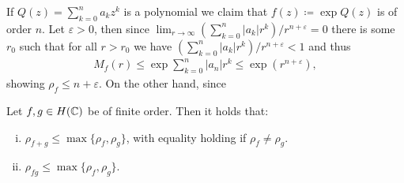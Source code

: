 \begin{remark}\label{rem:order-exponential-polynomial}
    If $Q(z) = \sum_{k=0}^n a_k z^k$ is a polynomial we claim that $f(z) \coloneqq \exp {Q(z)}$ is of order $n$. Let $\varepsilon > 0$, then since $\lim_{r \to \infty}(\sum_{k=0}^n \vert a_k \vert r^k) / r^{n + \varepsilon} = 0$ there is some $r_0$ such that for all $r > r_0$ we have $(\sum_{k=0}^n \vert a_k \vert r^k) / r^{n + \varepsilon} < 1$ and thus
    \begin{align*}
        M_f(r) \leq \exp \sum_{k=0}^n \vert a_n \vert r^k \leq \exp(r^{n + \varepsilon}),
    \end{align*}
    showing $\rho_f \leq n + \varepsilon$. On the other hand, since
\end{remark}

\begin{proposition} \label{prop:order-sum-product-estimate}
    Let $f, g \in H(\mathbb{C})$ be of finite order. Then it holds that:
    \begin{enumerate}[i.]
        \item $\rho_{f + g} \leq \max \{ \rho_f, \rho_g \}$, with equality holding if $\rho_f \neq \rho_g$.
        \item $\rho_{fg} \leq \max \{ \rho_f, \rho_g \}$.
    \end{enumerate}
\end{proposition}

